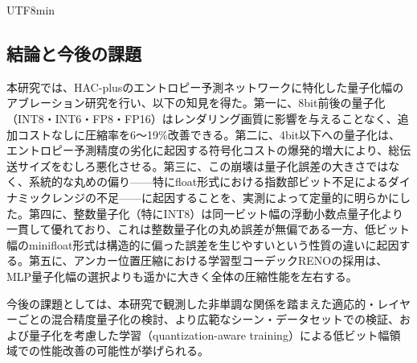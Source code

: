 \documentclass{ieeeaccess}
\begin{document}
\begin{CJK}{UTF8}{min}
\subsection{結論と今後の課題}
本研究では、HAC-plusのエントロピー予測ネットワークに特化した量子化幅のアブレーション研究を行い、以下の知見を得た。第一に、8bit前後の量子化（INT8・INT6・FP8・FP16）はレンダリング画質に影響を与えることなく、追加コストなしに圧縮率を6〜19\%改善できる。第二に、4bit以下への量子化は、エントロピー予測精度の劣化に起因する符号化コストの爆発的増大により、総伝送サイズをむしろ悪化させる。第三に、この崩壊は量子化誤差の大きさではなく、系統的な丸めの偏り——特にfloat形式における指数部ビット不足によるダイナミックレンジの不足——に起因することを、実測によって定量的に明らかにした。第四に、整数量子化（特にINT8）は同一ビット幅の浮動小数点量子化より一貫して優れており、これは整数量子化の丸め誤差が無偏である一方、低ビット幅のminifloat形式は構造的に偏った誤差を生じやすいという性質の違いに起因する。第五に、アンカー位置圧縮における学習型コーデックRENOの採用は、MLP量子化幅の選択よりも遥かに大きく全体の圧縮性能を左右する。

今後の課題としては、本研究で観測した非単調な関係を踏まえた適応的・レイヤーごとの混合精度量子化の検討、より広範なシーン・データセットでの検証、および量子化を考慮した学習（quantization-aware training）による低ビット幅領域での性能改善の可能性が挙げられる。
\end{CJK}

\end{document}
